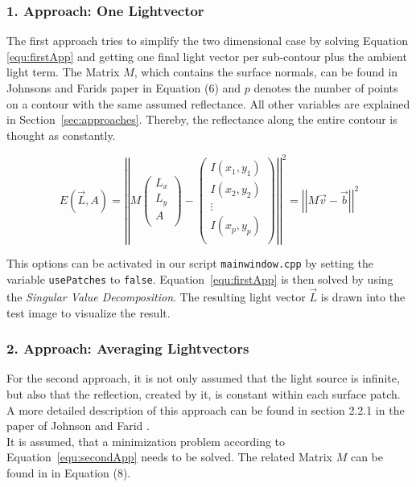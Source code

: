 \subsubsection{1. Approach: One Lightvector}\label{sec:appOne}

The first approach tries to simplify the two dimensional case by solving Equation \ref{equ:firstApp} and getting one final light vector per sub-contour plus the ambient light term. The Matrix $M$, which contains the surface normals, can be found in Johnsons and Farids paper \cite{Johnson} in Equation (6) and $p$ denotes the number of points on a contour with the same assumed reflectance. All other variables are explained in Section~\ref{sec:approaches}. Thereby, the reflectance along the entire contour is thought as constantly. 

\begin{equation}
\label{equ:firstApp}
E(\vec{L} , A) = 
\left\vert \left\vert 
M
\begin{pmatrix}
L_{x} \\
L_{y} \\
A \\
\end{pmatrix} -
\begin{pmatrix}
I(x_{1} , y_{1}) \\
I(x_{2} , y_{2}) \\
\vdots \\
I(x_{p} , y_{p}) \\
\end{pmatrix}
 \right\vert\right\vert^{2}
 = \left\vert \left\vert  M\vec{v}-\vec{b}  \right\vert\right\vert^{2}
\end{equation}

This options can be activated in our script \texttt{mainwindow.cpp} by setting the variable \texttt{usePatches} to \texttt{false}. Equation~\ref{equ:firstApp} is then solved by using the \textit{Singular Value Decomposition}. The resulting light vector $\vec{L}$ is drawn into the test image to visualize the result.  

\subsubsection{2. Approach: Averaging Lightvectors}\label{sec:appTwo}

For the second approach, it is not only assumed that the light source is infinite, but also that the reflection, created by it, is constant within each surface patch. A more detailed description of this approach can be found in section 2.2.1 in the paper of Johnson and Farid \cite{Johnson}.\\
It is assumed, that a minimization problem according to Equation~\ref{equ:secondApp} needs to be solved. The related Matrix $M$ can be found in \cite{Johnson} in Equation (8). \\

